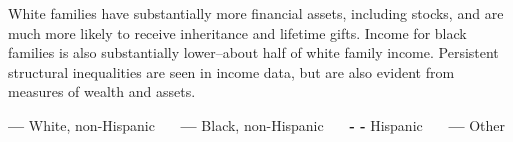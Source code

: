 \begin{minipage}{0.76\textwidth}
\vspace{1.5mm}

\small White families have substantially more financial assets, including stocks, and are much more likely to receive inheritance and lifetime gifts. Income for black families is also substantially lower--about half of white family income. Persistent structural inequalities are seen in income data, but are also evident from measures of wealth and assets.
\vspace{-0.5mm}

\vspace{-1mm}

\Large{\color{red!80!white}\textbf{---}} \footnotesize{White, non-Hispanic} \ \ \ \Large{\color{darkblue}\textbf{---}} \footnotesize{Black, non-Hispanic} \ \ \ \Large{\color{magenta!60!violet}\textbf{- -}} \footnotesize{Hispanic} \ \ \ \Large{\color{midgray}\textbf{---}} \footnotesize{Other}
\end{minipage}
\vspace{-1mm}

